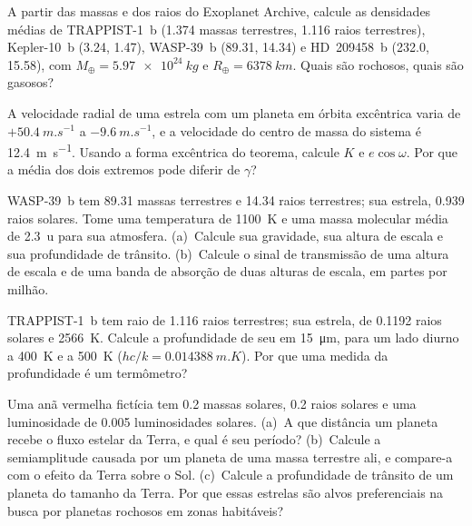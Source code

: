 \begin{exercise}[$\star\star$]\label{exo:b3:exoplanets:6}
A partir das massas e dos raios do Exoplanet Archive, calcule as densidades
médias de TRAPPIST-1~b (1.374 massas terrestres, 1.116 raios terrestres),
Kepler-10~b (3.24, 1.47), WASP-39~b (89.31, 14.34) e HD~209458~b (232.0,
15.58), com $M_\oplus = \qty{5.97e24}{kg}$ e $R_\oplus =
\qty{6378}{km}$. Quais são rochosos, quais são gasosos?
\end{exercise}

\begin{exercise}[$\star\star$]\label{exo:b3:exoplanets:7}
A velocidade radial de uma estrela com um planeta em órbita excêntrica
varia de $+\qty{50.4}{m.s^{-1}}$ a $-\qty{9.6}{m.s^{-1}}$, e a
velocidade do centro de massa do sistema é \qty{12.4}{m.s^{-1}}. Usando a
forma excêntrica do teorema, calcule $K$ e $e\cos\omega$. Por que a
média dos dois extremos pode diferir de $\gamma$?
\end{exercise}

\begin{exercise}[$\star\star$]\label{exo:b3:exoplanets:8}
WASP-39~b tem 89.31 massas terrestres e 14.34 raios terrestres; sua estrela, 0.939
raios solares. Tome uma temperatura de \qty{1100}{K} e uma massa molecular
média de \qty{2.3}{u} para sua atmosfera. (a)~Calcule sua gravidade, sua
altura de escala e sua profundidade de trânsito. (b)~Calcule o sinal de transmissão de
uma altura de escala e de uma banda de absorção de duas alturas de escala, em
partes por milhão.
\end{exercise}

\begin{exercise}[$\star\star$]\label{exo:b3:exoplanets:9}
TRAPPIST-1~b tem raio de 1.116 raios terrestres; sua estrela, de 0.1192 raios solares
e \qty{2566}{K}. Calcule a profundidade de seu  em
\qty{15}{\micro m}, para um lado diurno a \qty{400}{K} e a \qty{500}{K}
($hc/k = \qty{0.014388}{m.K}$). Por que uma medida da profundidade é um
termômetro?
\end{exercise}

\begin{exercise}[$\star\star\star$]\label{exo:b3:exoplanets:10}
Uma anã vermelha fictícia tem 0.2 massas solares, 0.2 raios solares e uma
luminosidade de \num{0.005} luminosidades solares. (a)~A que distância um
planeta recebe o fluxo estelar da Terra, e qual é seu período?
(b)~Calcule a semiamplitude causada por um planeta de uma massa terrestre
ali, e compare-a com o efeito da Terra sobre o Sol. (c)~Calcule a
profundidade de trânsito de um planeta do tamanho da Terra. Por que essas estrelas são
alvos preferenciais na busca por planetas rochosos em zonas habitáveis?
\end{exercise}


